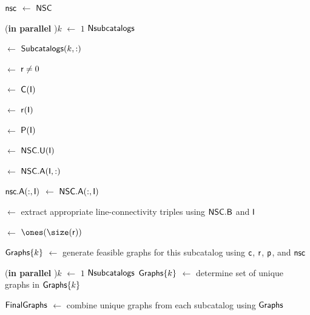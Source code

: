 \begin{vAlgorithm}[!ht]{\columnwidth}{0em}
$\textup{\textsf{nsc}}$ $\leftarrow$ $\textup{\textsf{NSC}}$ 

\For(\textbf{in parallel} \label{alg:app1:subcatalogs-l7}){$k$ $\leftarrow$ $1$ \KwTo $\textup{\textsf{Nsubcatalogs}}$}{

     $\leftarrow$ $\textup{\textsf{Subcatalogs}}(k,:)$ 


    
     $\leftarrow$ $\textup{\textsf{r}} \neq 0$ 

     $\leftarrow$ $\textup{\textsf{C}}(\textup{\textsf{I}})$  

     $\leftarrow$ $\textup{\textsf{r}}(\textup{\textsf{I}})$  

     $\leftarrow$ $\textup{\textsf{P}}(\textup{\textsf{I}})$ 

     $\leftarrow$ $\textup{\textsf{NSC}}.\textup{\textsf{U}}(\textup{\textsf{I}})$ 

     $\leftarrow$ $\textup{\textsf{NSC}}.\textup{\textsf{A}}(\textup{\textsf{I}},:)$ 

    $\textup{\textsf{nsc}}.\textup{\textsf{A}}(:,\textup{\textsf{I}})$ $\leftarrow$ $\textup{\textsf{NSC}}.\textup{\textsf{A}}(:,\textup{\textsf{I}})$ 

     $\leftarrow$ extract appropriate line-connectivity triples using $\textup{\textsf{NSC}}.\textup{\textsf{B}}$ and $\textup{\textsf{I}}$ 

     $\leftarrow$ $\ones(\size(\xvar{r}))$ 

    $\textup{\textsf{Graphs}}\{k\}$ $\leftarrow$ generate feasible graphs for this subcatalog using $\textup{\textsf{c}}$, $\textup{\textsf{r}}$, $\textup{\textsf{p}}$, and $\textup{\textsf{nsc}}$


}

\For(\textbf{in parallel} ){$k$ $\leftarrow$ $1$ \KwTo $\textup{\textsf{Nsubcatalogs}}$}{
    $\textup{\textsf{Graphs}}\{k\}$ $\leftarrow$ determine set of unique graphs in $\textup{\textsf{Graphs}}\{k\}$
}

$\textup{\textsf{FinalGraphs}}$ $\leftarrow$ combine unique graphs from each subcatalog using $\textup{\textsf{Graphs}}$

\end{vAlgorithm}